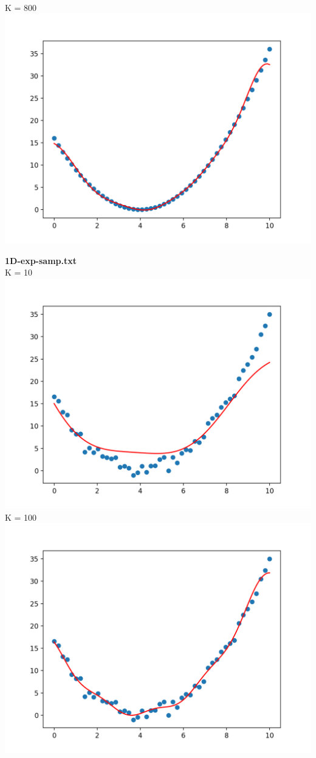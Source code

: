 \documentclass[12pt]{article}
\newcommand{\nextproblem}{
	\vfill
	\pagebreak
}
\begin{document}
\begin{enumerate}
\begin{enumerate}
	\\ K = 800
	\\ \includegraphics[height=0.3\textheight]{1Dquaduni800}
	\nextproblem
	\textbf{1D-exp-samp.txt}
	\\ K = 10
	\\ \includegraphics[height=0.3\textheight]{1Dquaduninoise10}
	\\ K = 100
	\\ \includegraphics[height=0.3\textheight]{1Dquaduninoise100}

\end{enumerate}
\end{enumerate}
\end{document}
